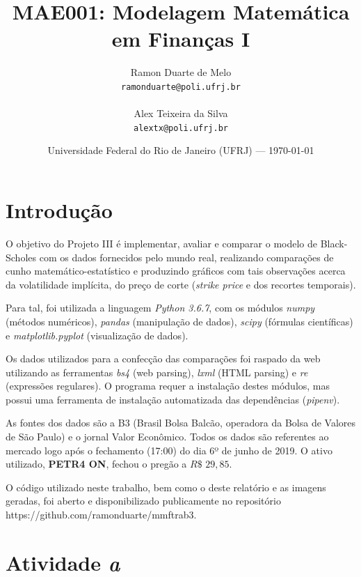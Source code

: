 \documentclass{article}
\title{MAE001: Modelagem Matemática em Finanças I} %
\date{Universidade Federal do Rio de Janeiro (UFRJ) --- \today} %
\author{Ramon Duarte de Melo\\ \texttt{ramonduarte@poli.ufrj.br} %
\\ \\ Alex Teixeira da Silva\\ \texttt{alextx@poli.ufrj.br}} %
\begin{document}
\maketitle %


\section*{Introdução} %

O objetivo do Projeto III é implementar, avaliar e comparar o modelo de Black-Scholes com os dados fornecidos pelo mundo real, realizando comparações de cunho matemático-estatístico e produzindo gráficos com tais observações acerca da volatilidade implícita, do preço de corte (\emph{strike price} e dos recortes temporais). 

Para tal, foi utilizada a linguagem \emph{Python 3.6.7}, com os módulos \emph{numpy} (métodos numéricos), \emph{pandas} (manipulação de dados), \emph{scipy} (fórmulas científicas) e \emph{matplotlib.pyplot} (visualização de dados).

Os dados utilizados para a confecção das comparações foi raspado da web utilizando as ferramentas \emph{bs4} (web parsing), \emph{lxml} (HTML parsing) e \emph{re} (expressões regulares). O programa requer a instalação destes módulos, mas possui uma ferramenta de instalação automatizada das dependências (\emph{pipenv}). 

As fontes dos dados são a B3 (Brasil Bolsa Balcão, operadora da Bolsa de Valores de São Paulo) e o jornal Valor Econômico. Todos os dados são referentes ao mercado logo após o fechamento (17:00) do dia 6º de junho de 2019. O ativo utilizado, \textbf{PETR4 ON}, fechou o pregão a $R\$ $ $29,85$.


O código utilizado neste trabalho, bem como o deste relatório e as imagens geradas, foi aberto e disponibilizado publicamente no repositório https://github.com/ramonduarte/mmftrab3.



\section*{Atividade \emph{a}} %
\end{document}

